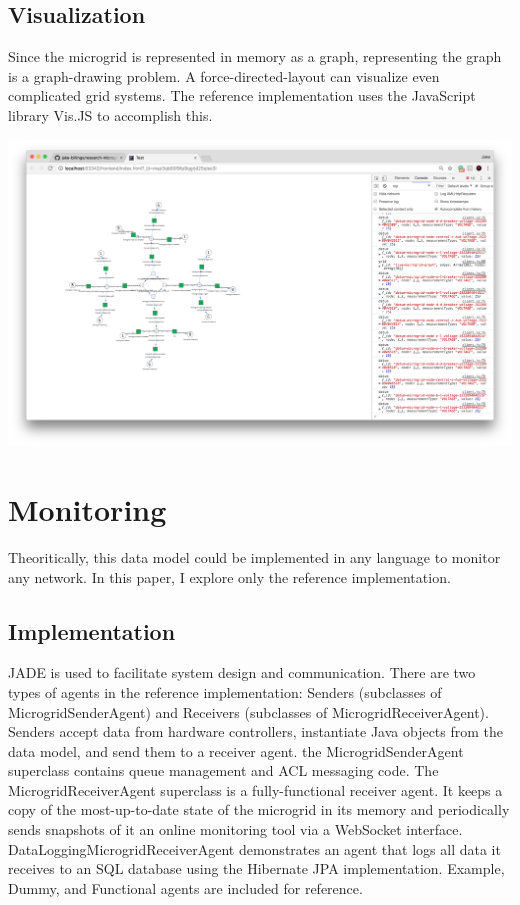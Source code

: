 \documentclass{article}
\begin{document}
\subsection{Visualization}
Since the microgrid is represented in memory as a graph, representing the graph is a graph-drawing problem. A force-directed-layout can visualize even complicated grid systems. The reference implementation uses the JavaScript library Vis.JS to accomplish this.

\includegraphics[width=\textwidth]{screenshots/preliminaryGraphRendering.png}

\section{Monitoring}
Theoritically, this data model could be implemented in any language to monitor any network. In this paper, I explore only the reference implementation.

\subsection{Implementation}
JADE is used to facilitate system design and communication. There are two types of agents in the reference implementation: Senders (subclasses of MicrogridSenderAgent) and Receivers (subclasses of MicrogridReceiverAgent). Senders accept data from hardware controllers, instantiate Java objects from the data model, and send them to a receiver agent. the MicrogridSenderAgent superclass contains queue management and ACL messaging code. The MicrogridReceiverAgent superclass is a fully-functional receiver agent. It keeps a copy of the most-up-to-date state of the microgrid in its memory and periodically sends snapshots of it an online monitoring tool via a WebSocket interface. DataLoggingMicrogridReceiverAgent demonstrates an agent that logs all data it receives to an SQL database using the Hibernate JPA implementation. Example, Dummy, and Functional agents are included for reference.
\end{document}
